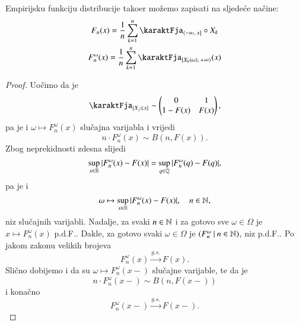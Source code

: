 \begin{nap} \label{nap:18.5-1}
    Empirijsku funkciju distribucije tako\dj er mo\v zemo zapisati na sljede\' ce na\v cine:
    \begin{equation*}
        \begin{gathered}
            F_n (x) =    \frac{1}{n} \suma{k = 1}{n} \karaktFja_{\lijInt{-\infty}{x}} \circ X_k\\
            F^\omega_n (x) = \frac{1}{n} \suma{k = 1}{n} \karaktFja_{\desInt{X_k(\omega)}{+\infty}}(x)
        \end{gathered}
    \end{equation*}
\end{nap}

\begin{proof}
    Uo\v cimo da je
    \begin{equation*}
        \karaktFja_{\{X_j \leq x\}} \sim
        \begin{pmatrix}
            0 & 1\\
            1 - F (x) & F (x)
        \end{pmatrix},
    \end{equation*}
    pa je i $\omega \mapsto F^\omega_n (x)$ slu\v cajna varijabla i vrijedi
    \begin{equation*}
        n \cdot F^\omega_n (x) \sim B(n, F(x)).
    \end{equation*}
    Zbog neprekidnosti zdesna slijedi
    \begin{equation*}
        \sup\limits_{x \in \mathbb{R}} |F^\omega_n (x) - F (x)| = \sup\limits_{q \in \mathbb{Q}} |F^\omega_n (q) - F (q)|,
    \end{equation*}
    pa je i
    \begin{equation*}
        \omega \mapsto \sup\limits_{x \in \mathbb{R}} |F^\omega_n (x) - F (x)|, \quad n \in \mathbb{N},
    \end{equation*}
    niz slu\v cajnih varijabli.
    Nadalje, za svaki $n \in \mathbb{N}$ i za gotovo sve $\omega \in \Omega$ je $x \mapsto F^\omega_n (x)$ p.d.F..
    Dakle, za gotovo svaki $\omega \in \Omega$ je $({F^\omega_n} \: | \: {n \in \mathbb{N}})$, niz p.d.F..
    Po jakom zakonu velikih brojeva
    \begin{equation*}
        F^\omega_n (x) \xrightarrow{g.s.} F(x).
    \end{equation*}
    Sli\v cno dobijemo i da su $\omega \mapsto F^\omega_n (x-)$ slu\v cajne varijable, te da je
    \begin{equation*}
        n \cdot F^\omega_n (x-) \sim B(n, F(x-))
    \end{equation*}
    i kona\v cno
    \begin{equation*}
        F^\omega_n (x-) \xrightarrow{g.s.} F(x-).
    \end{equation*}
    

\end{proof}
